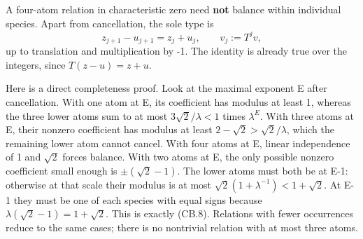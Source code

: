 A four-atom relation in characteristic zero need \textbf{not} balance within individual species. Apart from cancellation, the sole type is \[
 z_{j+1}-u_{j+1}=z_j+u_j,\qquad v_j:=T^jv,                     \tag{CB.8}
\] up to translation and multiplication by -1. The identity is already true over the integers, since \(T(z-u)=z+u\).

Here is a direct completeness proof. Look at the maximal exponent E after cancellation. With one atom at E, its coefficient has modulus at least 1, whereas the three lower atoms sum to at most \(3\sqrt2/\lambda<1\) times \(\lambda^E\). With three atoms at E, their nonzero coefficient has modulus at least \(2-\sqrt2>\sqrt2/\lambda\), which the remaining lower atom cannot cancel. With four atoms at E, linear independence of 1 and \(\sqrt2\) forces balance. With two atoms at E, the only possible nonzero coefficient small enough is \(\pm(\sqrt2-1)\). The lower atoms must both be at E-1: otherwise at that scale their modulus is at most \(\sqrt2(1+\lambda^{-1})<1+\sqrt2\). At E-1 they must be one of each species with equal signs because \(\lambda(\sqrt2-1)=1+\sqrt2\). This is exactly (CB.8). Relations with fewer occurrences reduce to the same cases; there is no nontrivial relation with at most three atoms.

